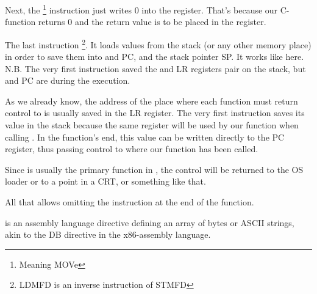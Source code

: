 Next, the \footnote{Meaning MOVe} instruction just writes 0 into the  register.
That's because our C-function returns 0 and the return value is to be placed in the  register.

The last instruction \footnote{\ac{LDMFD} is an inverse instruction of \ac{STMFD}}.
It loads values from the stack (or any other memory place) in order to save them into  and \ac{PC}, and  the \gls{stack pointer} \ac{SP}.
It works like \POP here.\\
N.B. The very first instruction  saved the  and \ac{LR} registers pair on the stack, but  and \ac{PC} are  during the  execution.

As we already know, the address of the place where each function must return control to is usually saved in the \ac{LR} register.
The very first instruction saves its value in the stack because the same register will be used by our
\main function when calling \printf.
In the function's end, this value can be written directly to the \ac{PC} register, thus passing control to where our function has been called.

Since \main is usually the primary function in \CCpp,
the control will be returned to the \ac{OS} loader or to a point in a \ac{CRT},
or something like that.

All that allows omitting the  instruction at the end of the function.

 is an assembly language directive defining an array of bytes or ASCII strings, akin to the DB directive 
in the x86-assembly language.

